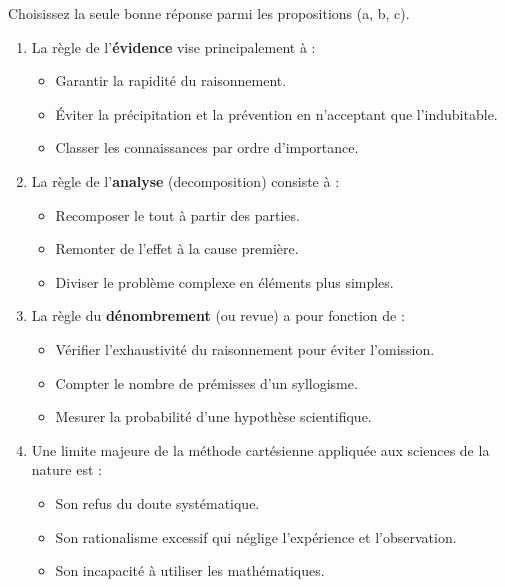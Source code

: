 \documentclass[11pt]{article}
\begin{document}
\begin{exercice}
Choisissez la seule bonne réponse parmi les propositions (a, b, c).
\begin{enumerate}
    \item La règle de l'\textbf{évidence} vise principalement à :
    \begin{itemize}
        \item[a)] Garantir la rapidité du raisonnement.
        \item[b)] Éviter la précipitation et la prévention en n'acceptant que l'indubitable.
        \item[c)] Classer les connaissances par ordre d'importance.
    \end{itemize}
    \item La règle de l'\textbf{analyse} (decomposition) consiste à :
    \begin{itemize}
        \item[a)] Recomposer le tout à partir des parties.
        \item[b)] Remonter de l'effet à la cause première.
        \item[c)] Diviser le problème complexe en éléments plus simples.
    \end{itemize}
    \item La règle du \textbf{dénombrement} (ou revue) a pour fonction de :
    \begin{itemize}
        \item[a)] Vérifier l'exhaustivité du raisonnement pour éviter l'omission.
        \item[b)] Compter le nombre de prémisses d'un syllogisme.
        \item[c)] Mesurer la probabilité d'une hypothèse scientifique.
    \end{itemize}
    \item Une limite majeure de la méthode cartésienne appliquée aux sciences de la nature est :
    \begin{itemize}
        \item[a)] Son refus du doute systématique.
        \item[b)] Son rationalisme excessif qui néglige l'expérience et l'observation.
        \item[c)] Son incapacité à utiliser les mathématiques.
    \end{itemize}
\end{enumerate}
\end{exercice}
\end{document}
